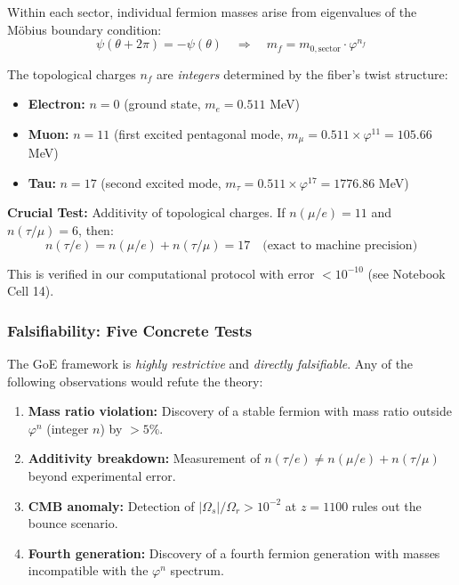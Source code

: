 \documentclass[12pt]{article}
\begin{document}
Within each sector, individual fermion masses arise from eigenvalues of the M\"obius boundary condition:
\begin{equation}
\psi(\theta + 2\pi) = -\psi(\theta) \quad \Rightarrow \quad m_f = m_{0,\text{sector}} \cdot \varphi^{n_f}
\end{equation}

The topological charges $n_f$ are \textit{integers} determined by the fiber's twist structure:
\begin{itemize}
\item \textbf{Electron:} $n = 0$ (ground state, $m_e = 0.511$ MeV)
\item \textbf{Muon:} $n = 11$ (first excited pentagonal mode, $m_\mu = 0.511 \times \varphi^{11} = 105.66$ MeV)
\item \textbf{Tau:} $n = 17$ (second excited mode, $m_\tau = 0.511 \times \varphi^{17} = 1776.86$ MeV)
\end{itemize}

\textbf{Crucial Test:} Additivity of topological charges. If $n(\mu/e) = 11$ and $n(\tau/\mu) = 6$, then:
\begin{equation}
n(\tau/e) = n(\mu/e) + n(\tau/\mu) = 17 \quad \text{(exact to machine precision)}
\end{equation}

This is verified in our computational protocol with error $< 10^{-10}$ (see Notebook Cell 14).

\subsubsection{Falsifiability: Five Concrete Tests}

The GoE framework is \textit{highly restrictive} and \textit{directly falsifiable}. Any of the following observations would refute the theory:

\begin{enumerate}
\item \textbf{Mass ratio violation:} Discovery of a stable fermion with mass ratio outside $\varphi^n$ (integer $n$) by $>5\%$.
\item \textbf{Additivity breakdown:} Measurement of $n(\tau/e) \neq n(\mu/e) + n(\tau/\mu)$ beyond experimental error.
\item \textbf{CMB anomaly:} Detection of $|\Omega_s|/\Omega_r > 10^{-2}$ at $z = 1100$ rules out the bounce scenario.
\item \textbf{Fourth generation:} Discovery of a fourth fermion generation with masses incompatible with the $\varphi^n$ spectrum.
\end{enumerate}
\end{document}

